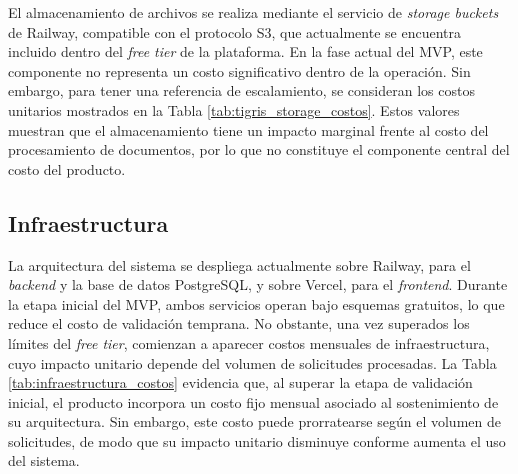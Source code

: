 El almacenamiento de archivos se realiza mediante el servicio de \textit{storage buckets} de Railway, compatible con el protocolo S3, que actualmente se encuentra incluido dentro del \textit{free tier} de la plataforma. En la fase actual del MVP, este componente no representa un costo significativo dentro de la operación. Sin embargo, para tener una referencia de escalamiento, se consideran los costos unitarios mostrados en la Tabla \ref{tab:tigris_storage_costos}. Estos valores muestran que el almacenamiento tiene un impacto marginal frente al costo del procesamiento de documentos, por lo que no constituye el componente central del costo del producto.

\begin{table}[H]
\centering
{}
\caption{Costos de referencia para almacenamiento S3 en Railway}
\label{tab:tigris_storage_costos}
\end{table}



\subsection{Infraestructura}

La arquitectura del sistema se despliega actualmente sobre Railway, para el \textit{backend} y la base de datos PostgreSQL, y sobre Vercel, para el \textit{frontend}. Durante la etapa inicial del MVP, ambos servicios operan bajo esquemas gratuitos, lo que reduce el costo de validación temprana. No obstante, una vez superados los límites del \textit{free tier}, comienzan a aparecer costos mensuales de infraestructura, cuyo impacto unitario depende del volumen de solicitudes procesadas. La Tabla \ref{tab:infraestructura_costos} evidencia que, al superar la etapa de validación inicial, el producto incorpora un costo fijo mensual asociado al sostenimiento de su arquitectura. Sin embargo, este costo puede prorratearse según el volumen de solicitudes, de modo que su impacto unitario disminuye conforme aumenta el uso del sistema.


